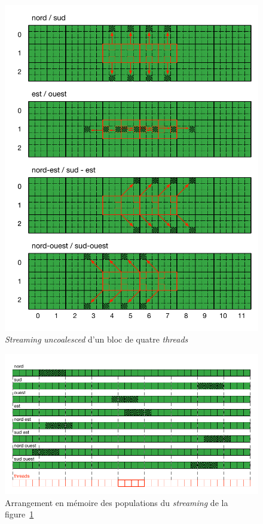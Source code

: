 \begin{figure}[h]
	\centering
	\includegraphics[fbox,scale=1.05]{images/streaming/sailfish_hist_misaligned.pdf}
	\caption{\textit{Streaming} \textit{uncoalesced} d'un bloc de quatre \textit{threads}}
	\label{fig:sailfish_hist_misaligned}
\end{figure}

\begin{figure}[h]
	\centering
	\includegraphics[fbox,scale=1.1]{images/streaming/sailfish_hist_alignment.pdf}
	\caption{Arrangement en mémoire des populations du \textit{streaming} de la figure~\ref{fig:sailfish_hist_misaligned}}
	\label{fig:sailfish_hist_alignment}
\end{figure}

